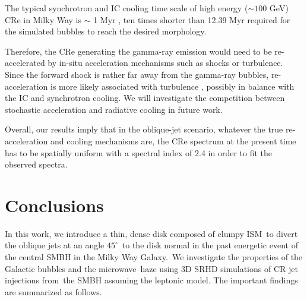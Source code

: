 \documentclass[fleqn,usenatbib,useAMS]{mnras}
\begin{document}
The typical synchrotron and IC cooling time scale of high energy ($\sim100$ GeV) CRe
in Milky Way is $\sim$ 1 Myr \citep{Yang2017}, ten times shorter than
12.39 Myr required for the simulated bubbles to reach the desired morphology.


Therefore, the CRe generating the gamma-ray emission would need to be re-accelerated
by in-situ acceleration mechanisms such as shocks or turbulence.
Since the forward shock is rather far away from the gamma-ray bubbles,
re-acceleration is more likely associated with turbulence \citep{Mertsch2011,Mertsch2019},
possibly in balance with the IC and synchrotron cooling. We will investigate the competition between stochastic acceleration and radiative cooling
in future work.

Overall, our results imply that in the oblique-jet scenario, whatever the true re-acceleration and cooling mechanisms are,
the CRe spectrum at the present time has to be spatially uniform with
a spectral index of 2.4 in order to fit the observed spectra.








\section{Conclusions}
\label{Conclusions}
In this work, we introduce a thin, dense disk composed of clumpy ISM\
to divert the oblique jets at an angle $45^{\circ}$\
to the disk normal in the past energetic event of the central SMBH in the Milky Way Galaxy.\
We investigate the properties of the Galactic bubbles and the microwave\
haze using 3D SRHD simulations of CR jet injections from\
the SMBH assuming the leptonic model. The important findings are summarized as follows.
\end{document}
